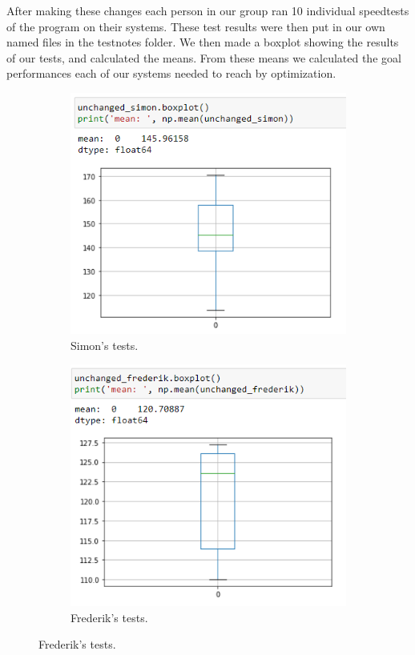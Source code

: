 \documentclass[parskip=full]{scrartcl}
\begin{document}
After making these changes each person in our group ran 10 individual speedtests of the program on their systems.
These test results were then put in our own named files in the testnotes folder.
We then made a boxplot showing the results of our tests, and calculated the means. 
From these means we calculated the goal performances each of our systems needed to reach by optimization.
\clearpage

\begin{figure}
    \centering %
    \begin{subfigure}[b]{0.4\textwidth}
        \caption{Simon's tests.} 
        \includegraphics[width=\textwidth]{simon_unchanged.PNG}
    \end{subfigure}
    \begin{subfigure}[b]{0.4\textwidth}
        \caption{Frederik's tests.} 
        \includegraphics[width=\textwidth]{frederik_unchanged.PNG}

\end{subfigure}
\end{figure}
\end{document}
